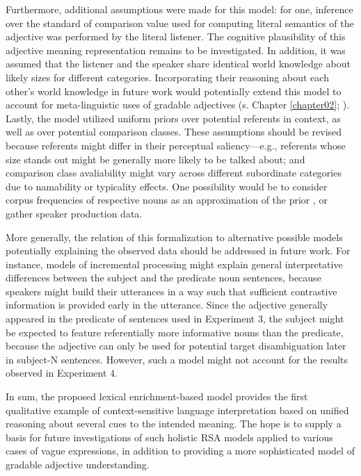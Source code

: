 Furthermore, additional assumptions were made for this model: for one, inference over the standard of comparison value used for computing literal semantics of the adjective was performed by the literal listener. The cognitive plausibility of this adjective meaning representation remains to be investigated. In addition, it was assumed that the listener and the speaker share identical world knowledge about likely sizes for different categories. Incorporating their reasoning about each other's world knowledge in future work would potentially extend this model to account for meta-linguistic uses of gradable adjectives (s. Chapter \ref{chapter02}; \textcite{barker2002dynamics}). Lastly, the model utilized uniform priors over potential referents in context, as well as over potential comparison classes. These assumptions should be revised because referents might differ in their perceptual saliency---e.g., referents whose size stands out might be generally more likely to be talked about; and comparison class avaliability might vary across different subordinate categories due to namability or typicality effects. One possibility would be to consider corpus frequencies of respective nouns as an approximation of the prior \parencite[following the model by][]{tessler2017warm}, or gather speaker production data. 

More generally, the relation of this formalization to alternative possible models potentially explaining the observed data should be addressed in future work. For instance, models of incremental processing might explain general interpretative differences between the subject and the predicate noun sentences, because speakers might build their utterances in a way such that sufficient contrastive information is provided early in the utterance. Since the adjective generally appeared in the predicate of sentences used in Experiment 3, the subject might be expected to feature referentially more informative nouns than the predicate, because the adjective can only be used for potential target disambiguation later  in subject-N sentences. However, such a model might not account for the results observed in Experiment 4.  

In sum, the proposed lexical enrichment-based model provides the first qualitative example of context-sensitive language interpretation based on unified reasoning about several cues to the intended meaning. The hope is to supply a basis for future investigations of such holistic RSA models applied to various cases of vague expressions, in addition to providing a more sophisticated model of gradable adjective understanding.
